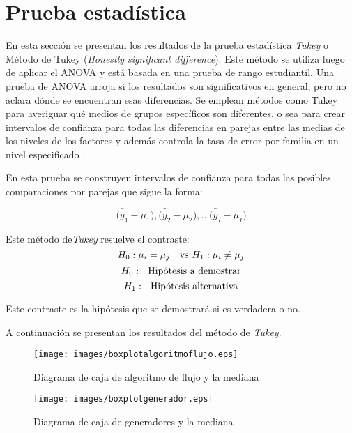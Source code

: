 \documentclass{article}
\begin{document}
\section{Prueba estadística}

En esta sección se presentan los resultados de la prueba estadística \textit{Tukey} o Método de Tukey (\textit{Honestly significant difference}). Este método se utiliza luego de aplicar el ANOVA y está basada en una prueba de rango estudiantil. Una prueba de ANOVA arroja si los resultados son significativos en general, pero no aclara dónde se encuentran esas diferencias. Se emplean métodos como Tukey para averiguar qué medios de grupos específicos son diferentes, o sea para crear intervalos de confianza para todas las diferencias en parejas entre las medias de los niveles de los factores y además controla la tasa de error por familia en un nivel especificado \cite{tukey}. %
 

En esta prueba se construyen intervalos de confianza para todas las posibles comparaciones por parejas que sigue la forma:  

\begin{equation}
 \bar{(y_{1}} - \mu_{1}), \bar{(y_{2}} - \mu_{2}),... \bar{(y_{I}} - \mu_{I}) 
\end{equation}

Este método de\textit{Tukey} resuelve el contraste:
\begin{equation}
 H_{0}: \mu_{i}= \mu_{j} \ \ \textup{ vs }   H_{1}: \mu_{i} \neq \mu_{j} 
\end{equation}
\begin{equation}
 H_{0}: \ \ \textup{Hipótesis a demostrar}
\end{equation} 
\begin{equation}
 H_{1}: \ \ \textup{Hipótesis  alternativa}
\end{equation} 

Este contraste es la hipótesis que se demostrará si es verdadera o no.

A continuación se presentan los resultados del método de \textit{Tukey}.

\begin{figure}[H] 
    \centering
              \texttt{[image: images/boxplotalgoritmoflujo.eps]}
\caption{Diagrama de caja de algoritmo de flujo y la mediana}
\label{fig:seq1}
\end{figure}   

\begin{figure}[H]
    \centering
        \texttt{[image: images/boxplotgenerador.eps]}
        
\caption{Diagrama de caja de generadores y la mediana}
\label{fig:seq1}
\end{figure}
\end{document}
